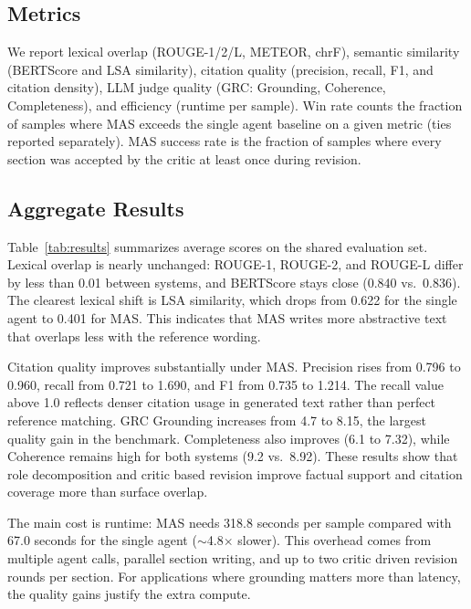 \documentclass[conference]{IEEEtran}
\begin{document}
\subsection{Metrics}
We report lexical overlap (ROUGE-1/2/L, METEOR, chrF), semantic similarity (BERTScore and LSA similarity), citation quality (precision, recall, F1, and citation density), LLM judge quality (GRC: Grounding, Coherence, Completeness), and efficiency (runtime per sample). Win rate counts the fraction of samples where MAS exceeds the single agent baseline on a given metric (ties reported separately). MAS success rate is the fraction of samples where every section was accepted by the critic at least once during revision.

\subsection{Aggregate Results}
Table~\ref{tab:results} summarizes average scores on the shared evaluation set. Lexical overlap is nearly unchanged: ROUGE-1, ROUGE-2, and ROUGE-L differ by less than 0.01 between systems, and BERTScore stays close (0.840 vs.\ 0.836). The clearest lexical shift is LSA similarity, which drops from 0.622 for the single agent to 0.401 for MAS. This indicates that MAS writes more abstractive text that overlaps less with the reference wording.

Citation quality improves substantially under MAS. Precision rises from 0.796 to 0.960, recall from 0.721 to 1.690, and F1 from 0.735 to 1.214. The recall value above 1.0 reflects denser citation usage in generated text rather than perfect reference matching. GRC Grounding increases from 4.7 to 8.15, the largest quality gain in the benchmark. Completeness also improves (6.1 to 7.32), while Coherence remains high for both systems (9.2 vs.\ 8.92). These results show that role decomposition and critic based revision improve factual support and citation coverage more than surface overlap.

The main cost is runtime: MAS needs 318.8 seconds per sample compared with 67.0 seconds for the single agent (${\sim}$4.8$\times$ slower). This overhead comes from multiple agent calls, parallel section writing, and up to two critic driven revision rounds per section. For applications where grounding matters more than latency, the quality gains justify the extra compute.
\end{document}
